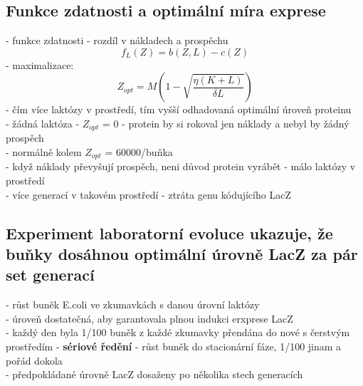 \documentclass[11pt,a4paper]{report}
\begin{document}
\subsection{Funkce zdatnosti a optimální míra exprese}
- funkce zdatnosti - rozdíl v nákladech a prospěchu\\
\begin{equation}
f_L(Z)=b(Z,L)-c(Z)
\end{equation}
- maximalizace:
\begin{equation}
Z_{opt}=M(1-\sqrt{\frac{\eta(K+L)}{\delta L}})
\end{equation}
\indent - čím více laktózy v prostředí, tím vyšší odhadovaná optimální úroveň proteinu\\
\indent \indent - žádná laktóza - $Z_{opt}$ = 0 - protein by si rokoval jen náklady a nebyl by žádný prospěch\\
\indent \indent - normálně kolem $Z_{opt}$ = 60000/buňka\\
\indent \indent - když náklady převyšují prospěch, neni důvod protein vyrábět - málo laktózy v prostředí\\
\indent \indent \indent - více generací v takovém prostředí - ztráta genu kódujícího LacZ\\

\subsection{Experiment laboratorní evoluce ukazuje, že buňky dosáhnou optimální úrovně LacZ za pár set generací}
- růst buněk E.coli ve zkumavkách s danou úrovní laktózy\\
\indent - úroveň dostatečná, aby garantovala plnou indukci erxprese LacZ\\
- každý den byla 1/100 buněk z každé zkumavky přendána do nové s čerstvým prostředím - \textbf{sériové ředění}
- růst buněk do stacionární fáze, 1/100 jinam a pořád dokola\\
- předpokládané úrovně LacZ dosaženy po několika stech generacích\\
\end{document}
